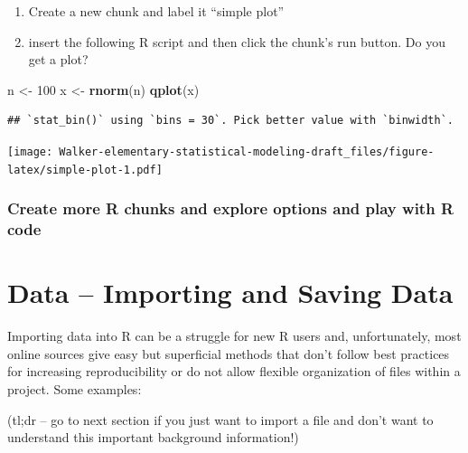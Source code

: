 \documentclass[]{book}
\newenvironment{Shaded}{\begin{snugshade}}{\end{snugshade}}
\newcommand{\KeywordTok}[1]{\textcolor[rgb]{0.13,0.29,0.53}{\textbf{#1}}}
\newcommand{\DecValTok}[1]{\textcolor[rgb]{0.00,0.00,0.81}{#1}}
\newcommand{\StringTok}[1]{\textcolor[rgb]{0.31,0.60,0.02}{#1}}
\newcommand{\NormalTok}[1]{#1}
\providecommand{\tightlist}{%
  \setlength{\itemsep}{0pt}\setlength{\parskip}{0pt}}
\begin{document}
\begin{enumerate}
\def\labelenumi{\arabic{enumi}.}
\setcounter{enumi}{3}
\tightlist
\item
  Create a new chunk and label it ``simple plot''
\item
  insert the following R script and then click the chunk's run button.
  Do you get a plot?
\end{enumerate}

\begin{Shaded}
\begin{Highlighting}[]
\NormalTok{n <-}\StringTok{ }\DecValTok{100}
\NormalTok{x <-}\StringTok{ }\KeywordTok{rnorm}\NormalTok{(n)}
\KeywordTok{qplot}\NormalTok{(x)}
\end{Highlighting}
\end{Shaded}

\begin{verbatim}
## `stat_bin()` using `bins = 30`. Pick better value with `binwidth`.
\end{verbatim}

\texttt{[image: Walker-elementary-statistical-modeling-draft\_files/figure-latex/simple-plot-1.pdf]}

\subsection{Create more R chunks and explore options and play with R
code}\label{create-more-r-chunks-and-explore-options-and-play-with-r-code}

\chapter{Data -- Importing and Saving
Data}\label{data-importing-and-saving-data}

Importing data into R can be a struggle for new R users and,
unfortunately, most online sources give easy but superficial methods
that don't follow best practices for increasing reproducibility or do
not allow flexible organization of files within a project. Some
examples:

(tl;dr -- go to next section if you just want to import a file and don't
want to understand this important background information!)
\end{document}
